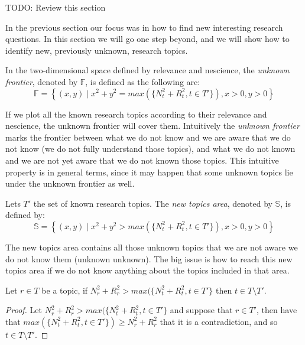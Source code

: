 {\color{red} TODO: Review this section}

In the previous section our focus was in how to find new interesting research questions. In this section we will go one step beyond, and we will show how to identify new, previously unknown, research topics.

\begin{definition}
In the two-dimensional space defined by relevance and nescience, the \textit{unknown frontier}, denoted by $\mathbb{F}$, is defined as the following arc:
\[
\mathbb{F} = \left\{(x,y) \mid x^{2}+y^{2}=max(\{N^2_{t} + R^2_{t}, t \in T'\}),x>0,y>0\right\} 
\]
\end{definition}

If we plot all the known research topics according to their relevance and nescience, the unknown frontier will cover them. Intuitively the \emph{unknown frontier} marks the frontier between what we do not know and we are aware that we do not know (we do not fully understand those topics), and what we do not known and we are not yet aware that we do not known those topics. This intuitive property is in general terms, since it may happen that some unknown topics lie under the unknown frontier as well.

\begin{definition}
Lets $T'$ the set of known research topics. The \emph{new topics area}, denoted by $\mathbb{S}$, is defined by:
\[
\mathbb{S} = \left\{(x,y) \mid x^{2}+y^{2}>max(\{N^2_{t} + R^2_{t}, t \in T'\}),x>0,y>0\right\} 
\]
\end{definition}

The new topics area contains all those unknown topics that we are not aware we do not know them (unknown unknown). The big issue is how to reach this new topics area if we do not know anything about the topics included in that area.

\begin{proposition}
\label{prop:new-topics-area}
Let $r \in T$ be a topic, if  $N^2_{r} + R^2_{r} > max(\{N^2_{t} + R^2_{t}, t \in T'\}$ then $t \in T \setminus T'$.
\end{proposition}
\begin{proof}
Let $N^2_{r} + R^2_{r} > max(\{N^2_{t} + R^2_{t}, t \in T'\}$ and suppose that $r \in T'$, then have that $max(\{N^2_{t} + R^2_{t}, t \in T'\}) \geq N^2_{r} + R^2_{r}$ that it is a contradiction, and so $t \in T \setminus T'$.
\end{proof}

